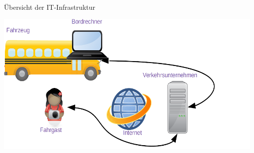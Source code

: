 
\begin{frame}{Übersicht der IT-Infrastruktur}
  \begin{center}
    \includegraphics[width=1.1\textwidth]{public-transport/public-transport-simple-06-04-2021.png}
  \end{center}
\end{frame}
